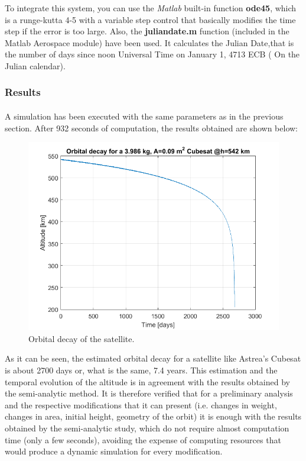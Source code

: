 To integrate this system, you can use the \emph{Matlab} built-in function \textbf{ode45}, which is a runge-kutta 4-5 with a variable step control that basically modifies the time step if the error is too large.
Also, the \textbf{juliandate.m} function (included in the Matlab Aerospace module) have been used. It calculates the Julian Date,that is the number of days since noon Universal Time on January 1, 4713 ECB ( On the Julian calendar).

\subsubsection{Results}
\paragraph{}A simulation has been executed with the same parameters as in the previous section. After 932 seconds of computation, the results obtained are shown below:

\begin{figure}[H]
\centering
\includegraphics[scale=1]{./decay/graph.png}
\caption{Orbital decay of the satellite.}
\label{fig:COE}
\end{figure}

As it can be seen, the estimated orbital decay for a satellite like Astrea's Cubesat is about 2700 days or, what is the same, 7.4 years. This estimation and the temporal evolution of the altitude is in agreement with the results obtained by the semi-analytic method. It is therefore verified that for a preliminary analysis and the respective modifications that it can present (i.e. changes in weight, changes in area, initial height, geometry of the orbit) it is enough with the results obtained by the semi-analytic study, which do not require almost computation time (only a few seconds), avoiding the expense of computing resources that would produce a dynamic simulation for every modification.
